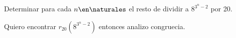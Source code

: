 \ejercicio
Determinar para cada $n \en \naturales$ el resto de dividir a $8^{3^n-2}$ por 20.

\separadorCorto

Quiero encontrar $r_{20}(8^{3^n-2})$ entonces analizo congruecia.

